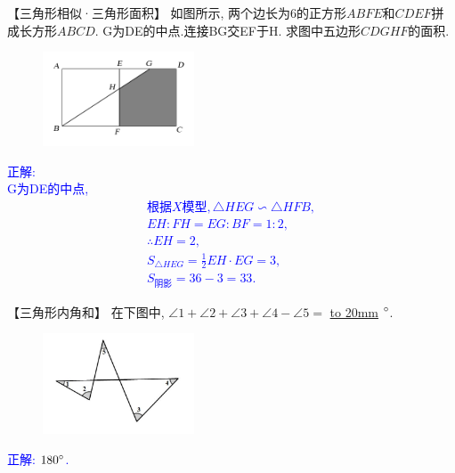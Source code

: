 \item {
    【三角形相似·三角形面积】
    如图所示, 两个边长为6的正方形$ABFE$和$CDEF$拼成长方形$ABCD$. G为DE的中点.连接BG交EF于H. 求图中五边形$CDGHF$的面积.
    \begin{figure}[H] 
        \centering
        \includegraphics[width=0.4\textwidth]{./pics/Chapter_2/13.png}
    \end{figure}
    \ifshowSolution 
        \fangsong{}\textcolor{blue}{
            正解: \\
            G为DE的中点,\\
            \begin{align*}
                根据X模型, \triangle HEG \backsim \triangle HFB, \\
                EH:FH = EG:BF = 1:2, \\
                \therefore EH=2, \\
                S_{\triangle HEG} = \frac{1}{2}EH\cdot EG = 3, \\
                S_{阴影} = 36 - 3 = 33.
            \end{align*}
        }
    \else
        \vspace{1cm}
    \fi
}

\item {
    【三角形内角和】
    {在下图中, $\angle 1 + \angle 2 + \angle 3 + \angle 4 - \angle 5=$ \underline{\hbox to 20mm{}} $\degree$.} 
    \begin{figure}[H] 
        \centering
        \includegraphics[width=0.4\textwidth]{./pics/Chapter_2/9.png}
    \end{figure}
    \ifshowSolution 
        \fangsong{}\textcolor{blue}{
            正解: $180\degree$. \\
        }
    \else
        \vspace{1cm}
    \fi
}

